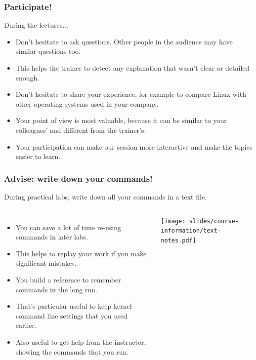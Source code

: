\begin{frame}
\frametitle{Participate!}
During the lectures...
\begin{itemize}
\item Don't hesitate to ask questions. Other people in the audience may have
similar questions too.
\item This helps the trainer to detect any explanation that wasn't clear or
detailed enough.
\item Don't hesitate to share your experience, for example to compare Linux
with other operating systems used in your company.
\item Your point of view is most valuable, because it can be similar to your
colleagues' and different from the trainer's.
\item Your participation can make our session more interactive and make the
topics easier to learn.
\end{itemize}
\end{frame}

\begin{frame}
\frametitle{Advise: write down your commands!}
During practical labs, write down all your commands in a text file.
\begin{columns}
  \begin{itemize}
  \item You can save a lot of time re-using commands in later labs.
  \item This helps to replay your work if you make significant mistakes.
  \item You build a reference to remember commands in the long run.
  \item That's particular useful to keep kernel command line settings
        that you used earlier.
  \item Also useful to get help from the instructor, showing the
        commands that you run.
  \end{itemize}
  \texttt{[image: slides/course-information/text-notes.pdf]}
\end{columns}
\end{frame}

